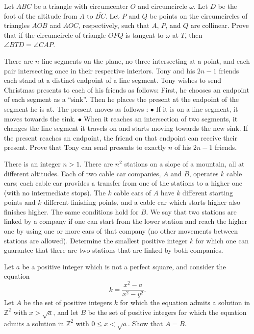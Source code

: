 \documentclass[11pt]{scrartcl}
\begin{document}
\begin{problem}[659871714637060308]
Let $ABC$ be a triangle with circumcenter $O$ and circumcircle $\omega$. Let $D$ be the foot of the altitude from $A$ to $\overline{BC}$. Let $P$ and $Q$ be points on the circumcircles of triangles $AOB$ and $AOC$, respectively, such that $A$, $P$, and $Q$ are collinear. Prove that if the circumcircle of triangle $OPQ$ is tangent to $\omega$ at $T$, then $\angle BTD=\angle CAP$.
\end{problem}
\begin{problem}[671689594281308077]
There are $n$ line segments on the plane, no three intersecting at a point, and each pair intersecting once in their respective interiors. Tony and his $2n - 1$ friends each stand at a distinct endpoint of a line segment. Tony wishes to send Christmas presents to each of his friends as follows:
First, he chooses an endpoint of each segment as a “sink”. Then he places the present at
the endpoint of the segment he is at. The present moves as follows :
$\bullet$ If it is on a line segment, it moves towards the sink.
$\bullet$ When it reaches an intersection of two segments, it changes the line segment it travels on and starts moving towards the new sink.
If the present reaches an endpoint, the friend on that endpoint can receive their present.
Prove that Tony can send presents to exactly $n$ of his $2n - 1$ friends.
\end{problem}
\begin{problem}[695330092247108707]
There is an integer $n > 1$. There are $n^2$ stations on a slope of a mountain, all at different altitudes. Each of two cable car companies, $A$ and $B$, operates $k$ cable cars; each cable car provides a transfer from one of the stations to a higher one (with no intermediate stops). The $k$ cable cars of $A$ have $k$ different starting points and $k$ different finishing points, and a cable car which starts higher also finishes higher. The same conditions hold for $B$. We say that two stations are linked by a company if one can start from the lower station and reach the higher one by using one or more cars of that company (no other movements between stations are allowed). Determine the smallest positive integer $k$ for which one can guarantee that there are two stations that are linked by both companies.
\end{problem}
\begin{problem}[709130660277794345]
	Let $a$ be a positive integer which is not a perfect square, and consider the equation\[k = \frac{x^2-a}{x^2-y^2}.\]Let $A$ be the set of positive integers $k$ for which the equation admits a solution in $\mathbb Z^2$ with $x>\sqrt{a}$, and let $B$ be the set of positive integers for which the equation admits a solution in $\mathbb Z^2$ with $0\leq x<\sqrt{a}$. Show that $A=B$.
\end{problem}
\end{document}
